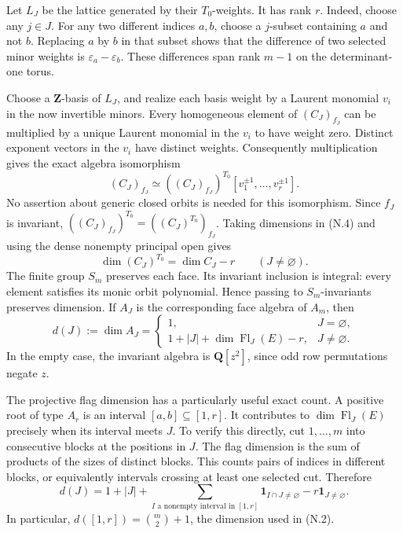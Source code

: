 \documentclass[
  10pt,
]{article}
\begin{document}
Let \(L_J\) be the lattice generated by their \(T_0\)-weights. It has
rank \(r\). Indeed, choose any \(j\in J\). For any two different indices
\(a,b\), choose a \(j\)-subset containing \(a\) and not \(b\). Replacing
\(a\) by \(b\) in that subset shows that the difference of two selected
minor weights is \(\varepsilon_a-\varepsilon_b\). These differences span
rank \(m-1\) on the determinant-one torus.

Choose a \(\mathbf Z\)-basis of \(L_J\), and realize each basis weight
by a Laurent monomial \(v_i\) in the now invertible minors. Every
homogeneous element of \((C_J)_{f_J}\) can be multiplied by a unique
Laurent monomial in the \(v_i\) to have weight zero. Distinct exponent
vectors in the \(v_i\) have distinct weights. Consequently
multiplication gives the exact algebra isomorphism \[
(C_J)_{f_J}
\simeq ((C_J)_{f_J})^{T_0}
[v_1^{\pm1},\ldots,v_r^{\pm1}].
\tag{N.4}
\] No assertion about generic closed orbits is needed for this
isomorphism. Since \(f_J\) is invariant,
\(((C_J)_{f_J})^{T_0}=((C_J)^{T_0})_{f_J}\). Taking dimensions in (N.4)
and using the dense nonempty principal open gives \[
\dim (C_J)^{T_0}=\dim C_J-r\qquad(J\ne\varnothing).
\tag{N.5}
\] The finite group \(S_m\) preserves each face. Its invariant inclusion
is integral: every element satisfies its monic orbit polynomial. Hence
passing to \(S_m\)-invariants preserves dimension. If \(A_J\) is the
corresponding face algebra of \(A_m\), then \[
d(J):=\dim A_J
=\begin{cases}
1,&J=\varnothing,\\
1+|J|+\dim\operatorname{Fl}_J(E)-r,&J\ne\varnothing.
\end{cases}
\tag{N.6}
\] In the empty case, the invariant algebra is \(\mathbf Q[z^2]\), since
odd row permutations negate \(z\).

The projective flag dimension has a particularly useful exact count. A
positive root of type \(A_r\) is an interval \([a,b]\subseteq[1,r]\). It
contributes to \(\dim\operatorname{Fl}_J(E)\) precisely when its
interval meets \(J\). To verify this directly, cut \(1,\ldots,m\) into
consecutive blocks at the positions in \(J\). The flag dimension is the
sum of products of the sizes of distinct blocks. This counts pairs of
indices in different blocks, or equivalently intervals crossing at least
one selected cut. Therefore \[
d(J)=1+|J|+
\sum_{I\text{ a nonempty interval in }[1,r]}\mathbf1_{I\cap J\ne\varnothing}
-r\mathbf1_{J\ne\varnothing}.
\tag{N.7}
\] In particular, \(d([1,r])=\binom m2+1\), the dimension used in (N.2).
\end{document}
